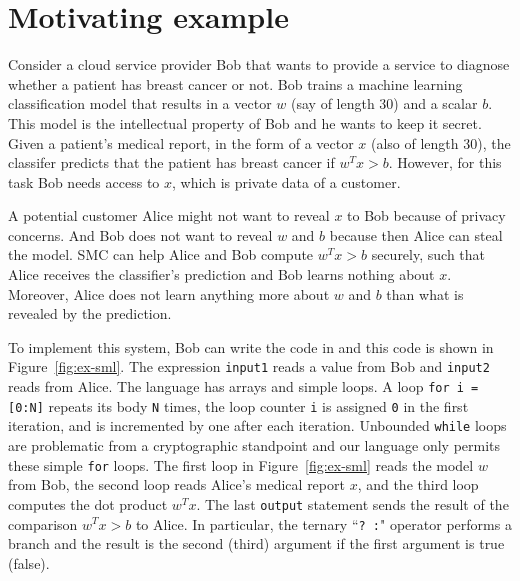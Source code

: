 \section{Motivating example}
\label{sec:ex}
Consider a  cloud service provider Bob that wants to provide a service to diagnose
whether a patient has breast cancer or not. Bob trains a machine learning classification model
that results in a vector $w$ (say of length 30) and a scalar $b$.
This model is the intellectual property of Bob and he  wants to keep it secret.
Given a patient's medical report, in the form of a vector $x$ (also of length 30),
the classifer predicts that the patient has breast cancer if $w^Tx>b$.
However, for this task Bob needs access to $x$, which is private data of a customer.

A potential customer Alice might not want to reveal $x$ to Bob because of privacy concerns.
And Bob does not want to reveal $w$ and $b$ because then Alice can steal the model.
SMC can help Alice and Bob compute $w^Tx>b$ securely, such that Alice receives the classifier's
prediction and Bob learns nothing about $x$. Moreover, Alice does not learn anything more about $w$
and $b$ than what is revealed by the prediction. 

To implement this system, Bob can write the code in \tool and this code is shown in Figure~\ref{fig:ex-sml}.
The expression {\tt input1} reads a value from Bob and {\tt input2} reads from Alice.
The language has arrays and simple loops. A loop {\tt for i = [0:N]} repeats its
body {\tt N} times, the loop counter {\tt i} is assigned {\tt 0} in the first iteration,
and is incremented by one after each iteration. Unbounded {\tt while} loops are problematic
from a cryptographic standpoint and our language only permits these simple {\tt for} loops. 
The first loop in Figure~\ref{fig:ex-sml} reads the model $w$ from Bob, the second loop reads
Alice's medical report $x$, and the third loop computes the dot product $w^Tx$.
The last {\tt output} statement sends the result of the comparison $w^Tx>b$ to Alice.
In particular, the ternary ``{\tt ? :}" operator performs a branch and the result is the second (third)
argument if the first argument is true (false).

